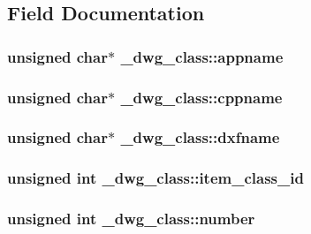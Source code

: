 \subsection{\-Field \-Documentation}
\hypertarget{struct__dwg__class_a82d2c46f2ac92d33d793a62667cea93e}{
\subsubsection[{appname}]{\setlength{\rightskip}{0pt plus 5cm}unsigned char$\ast$ {\bf \-\_\-dwg\-\_\-class\-::appname}}}\label{struct__dwg__class_a82d2c46f2ac92d33d793a62667cea93e}
\hypertarget{struct__dwg__class_a5cba8c7723f09460ca272f70f5d143d7}{
\subsubsection[{cppname}]{\setlength{\rightskip}{0pt plus 5cm}unsigned char$\ast$ {\bf \-\_\-dwg\-\_\-class\-::cppname}}}\label{struct__dwg__class_a5cba8c7723f09460ca272f70f5d143d7}
\hypertarget{struct__dwg__class_a2988169f0ccbf35cdb1bdc3aaddf25a6}{
\subsubsection[{dxfname}]{\setlength{\rightskip}{0pt plus 5cm}unsigned char$\ast$ {\bf \-\_\-dwg\-\_\-class\-::dxfname}}}\label{struct__dwg__class_a2988169f0ccbf35cdb1bdc3aaddf25a6}
\hypertarget{struct__dwg__class_a9336c9251fa7e5ac3ee4496e087c738b}{
\subsubsection[{item\-\_\-class\-\_\-id}]{\setlength{\rightskip}{0pt plus 5cm}unsigned int {\bf \-\_\-dwg\-\_\-class\-::item\-\_\-class\-\_\-id}}}\label{struct__dwg__class_a9336c9251fa7e5ac3ee4496e087c738b}
\hypertarget{struct__dwg__class_a5c5cb7695f660cb9c42e6e8abf6920e8}{
\subsubsection[{number}]{\setlength{\rightskip}{0pt plus 5cm}unsigned int {\bf \-\_\-dwg\-\_\-class\-::number}}}\label{struct__dwg__class_a5c5cb7695f660cb9c42e6e8abf6920e8}
